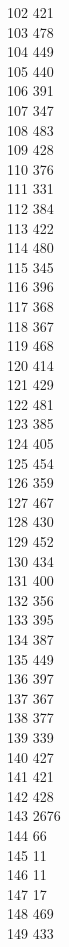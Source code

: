 { 102	421 \\
 103	478 \\
 104	449 \\
 105	440 \\
 106	391 \\
 107	347 \\
 108	483 \\
 109	428 \\
 110	376 \\
 111	331 \\
 112	384 \\
 113	422 \\
 114	480 \\
 115	345 \\
 116	396 \\
 117	368 \\
 118	367 \\
 119	468 \\
 120	414 \\
 121	429 \\
 122	481 \\
 123	385 \\
 124	405 \\
 125	454 \\
 126	359 \\
 127	467 \\
 128	430 \\
 129	452 \\
 130	434 \\
 131	400 \\
 132	356 \\
 133	395 \\
 134	387 \\
 135	449 \\
 136	397 \\
 137	367 \\
 138	377 \\
 139	339 \\
 140	427 \\
 141	421 \\
 142	428 \\
 143	2676 \\
 144	66 \\
 145	11 \\
 146	11 \\
 147	17 \\
 148	469 \\
 149	433 \\
}
